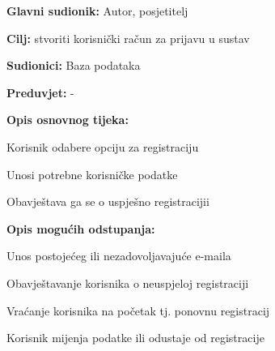 					\noindent {}
					\begin{packed_item}
	
						\item \textbf{Glavni sudionik: }Autor, posjetitelj
						\item  \textbf{Cilj:} stvoriti korisnički račun za prijavu u sustav
						\item  \textbf{Sudionici:} Baza podataka
						\item  \textbf{Preduvjet:} -
						\item  \textbf{Opis osnovnog tijeka:}
						
						\item[] \begin{packed_enum}
	
							\item Korisnik odabere opciju za registraciju
							\item Unosi potrebne korisničke podatke
							\item Obavještava ga se o uspješno registracijii
						\end{packed_enum}
						
						\item  \textbf{Opis mogućih odstupanja:}
						
						\item[] \begin{packed_item}
	
							\item Unos postojećeg ili nezadovoljavajuće e-maila

							\item[] \begin{packed_enum}
								
								\item Obavještavanje korisnika o neuspjeloj registraciji
								\item Vraćanje korisnika na početak tj. ponovnu registracij
								\item Korisnik mijenja podatke ili odustaje od registracije
								
							\end{packed_enum}
							
						\end{packed_item}
					\end{packed_item}

